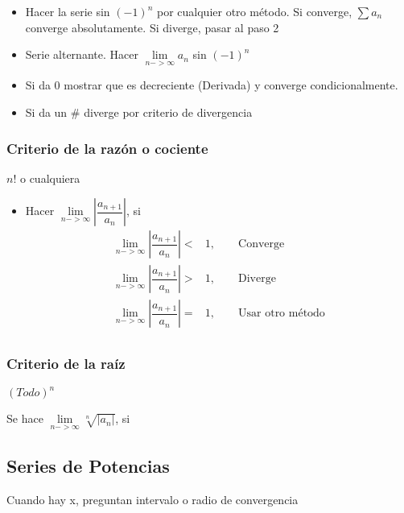 \begin{itemize}
	\item Hacer la serie sin $(-1)^n$ por cualquier otro método. Si converge, $\sum a_n$  converge absolutamente. Si diverge, pasar al paso 2
	\item Serie alternante. Hacer $\lim\limits_{n -> \infty}a_n$ sin $(-1)^n$
	\item Si da 0 mostrar que es decreciente (Derivada) y converge condicionalmente.
	\item Si da un $\#$ diverge por criterio de divergencia 
	
\end{itemize}

\subsubsection{Criterio de la razón o cociente}
$n!$ o cualquiera

\begin{itemize}
	\item Hacer $\lim\limits_{n -> \infty}\left| \dfrac{a_{n+1}}{a_n} \right| $, si
	\begin{align*}
	\lim\limits_{n -> \infty}\left| \dfrac{a_{n+1}}{a_n} \right|<&1,\qquad \text{Converge}\\
	\lim\limits_{n -> \infty}\left| \dfrac{a_{n+1}}{a_n} \right|>&1,\qquad \text{Diverge}\\
	\lim\limits_{n -> \infty}\left| \dfrac{a_{n+1}}{a_n} \right|=&1,\qquad \text{Usar otro método}\\
	\end{align*}
\end{itemize}

\subsubsection{Criterio de la raíz }
$(Todo)^n$

Se hace $\lim\limits_{n -> \infty}\sqrt[n]{|a_n|}$, si


\subsection{Series de Potencias}
Cuando hay x, preguntan intervalo o radio de convergencia

